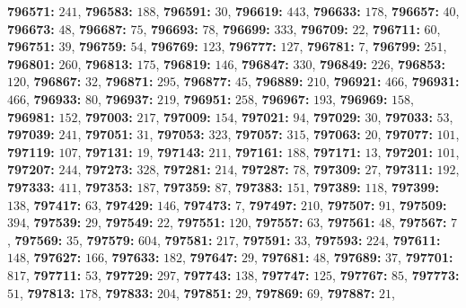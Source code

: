 \textsf{\bfseries 796571:} $241$, \textsf{\bfseries 796583:} $188$, \textsf{\bfseries 796591:} $30$, \textsf{\bfseries 796619:} $443$, \textsf{\bfseries 796633:} $178$, \textsf{\bfseries 796657:} $40$, \textsf{\bfseries 796673:} $48$, \textsf{\bfseries 796687:} $75$, \textsf{\bfseries 796693:} $78$, \textsf{\bfseries 796699:} $333$, \textsf{\bfseries 796709:} $22$, \textsf{\bfseries 796711:} $60$, \textsf{\bfseries 796751:} $39$, \textsf{\bfseries 796759:} $54$, \textsf{\bfseries 796769:} $123$, \textsf{\bfseries 796777:} $127$, \textsf{\bfseries 796781:} $7$, \textsf{\bfseries 796799:} $251$, \textsf{\bfseries 796801:} $260$, \textsf{\bfseries 796813:} $175$, \textsf{\bfseries 796819:} $146$, \textsf{\bfseries 796847:} $330$, \textsf{\bfseries 796849:} $226$, \textsf{\bfseries 796853:} $120$, \textsf{\bfseries 796867:} $32$, \textsf{\bfseries 796871:} $295$, \textsf{\bfseries 796877:} $45$, \textsf{\bfseries 796889:} $210$, \textsf{\bfseries 796921:} $466$, \textsf{\bfseries 796931:} $466$, \textsf{\bfseries 796933:} $80$, \textsf{\bfseries 796937:} $219$, \textsf{\bfseries 796951:} $258$, \textsf{\bfseries 796967:} $193$, \textsf{\bfseries 796969:} $158$, \textsf{\bfseries 796981:} $152$, \textsf{\bfseries 797003:} $217$, \textsf{\bfseries 797009:} $154$, \textsf{\bfseries 797021:} $94$, \textsf{\bfseries 797029:} $30$, \textsf{\bfseries 797033:} $53$, \textsf{\bfseries 797039:} $241$, \textsf{\bfseries 797051:} $31$, \textsf{\bfseries 797053:} $323$, \textsf{\bfseries 797057:} $315$, \textsf{\bfseries 797063:} $20$, \textsf{\bfseries 797077:} $101$, \textsf{\bfseries 797119:} $107$, \textsf{\bfseries 797131:} $19$, \textsf{\bfseries 797143:} $211$, \textsf{\bfseries 797161:} $188$, \textsf{\bfseries 797171:} $13$, \textsf{\bfseries 797201:} $101$, \textsf{\bfseries 797207:} $244$, \textsf{\bfseries 797273:} $328$, \textsf{\bfseries 797281:} $214$, \textsf{\bfseries 797287:} $78$, \textsf{\bfseries 797309:} $27$, \textsf{\bfseries 797311:} $192$, \textsf{\bfseries 797333:} $411$, \textsf{\bfseries 797353:} $187$, \textsf{\bfseries 797359:} $87$, \textsf{\bfseries 797383:} $151$, \textsf{\bfseries 797389:} $118$, \textsf{\bfseries 797399:} $138$, \textsf{\bfseries 797417:} $63$, \textsf{\bfseries 797429:} $146$, \textsf{\bfseries 797473:} $7$, \textsf{\bfseries 797497:} $210$, \textsf{\bfseries 797507:} $91$, \textsf{\bfseries 797509:} $394$, \textsf{\bfseries 797539:} $29$, \textsf{\bfseries 797549:} $22$, \textsf{\bfseries 797551:} $120$, \textsf{\bfseries 797557:} $63$, \textsf{\bfseries 797561:} $48$, \textsf{\bfseries 797567:} $7$, \textsf{\bfseries 797569:} $35$, \textsf{\bfseries 797579:} $604$, \textsf{\bfseries 797581:} $217$, \textsf{\bfseries 797591:} $33$, \textsf{\bfseries 797593:} $224$, \textsf{\bfseries 797611:} $148$, \textsf{\bfseries 797627:} $166$, \textsf{\bfseries 797633:} $182$, \textsf{\bfseries 797647:} $29$, \textsf{\bfseries 797681:} $48$, \textsf{\bfseries 797689:} $37$, \textsf{\bfseries 797701:} $817$, \textsf{\bfseries 797711:} $53$, \textsf{\bfseries 797729:} $297$, \textsf{\bfseries 797743:} $138$, \textsf{\bfseries 797747:} $125$, \textsf{\bfseries 797767:} $85$, \textsf{\bfseries 797773:} $51$, \textsf{\bfseries 797813:} $178$, \textsf{\bfseries 797833:} $204$, \textsf{\bfseries 797851:} $29$, \textsf{\bfseries 797869:} $69$, \textsf{\bfseries 797887:} $21$, 

